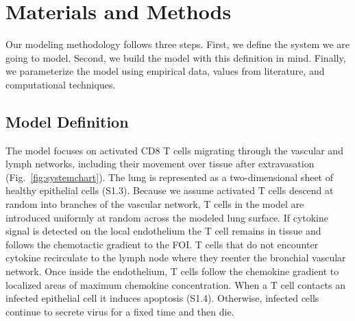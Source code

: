 \documentclass[10pt]{article}
\begin{document}
\section*{Materials and Methods}


Our modeling methodology follows three steps.  First, we define the system we are going to model.  Second, we build the model with this definition in mind.  Finally, we parameterize the model using empirical data, values from literature, and computational techniques.

\subsection*{Model Definition}


The model focuses on activated CD8 T cells migrating through the vascular and lymph networks, including their movement over tissue after extravasation (Fig.~\ref{fig:systemchart}).  The lung is represented as a two-dimensional sheet of healthy epithelial cells (S1.3).   Because we assume activated T cells descend at random into branches of the vascular network, T cells in the model are introduced uniformly at random across the modeled lung surface.  If cytokine signal is detected on the local endothelium the T cell remains in tissue and follows the chemotactic gradient to the FOI.  T cells that do not encounter cytokine recirculate to the lymph node where they reenter the bronchial vascular network.  Once inside the endothelium, T cells follow the chemokine gradient to localized areas of maximum chemokine concentration.  When a T cell contacts an infected epithelial cell it induces apoptosis (S1.4).  Otherwise, infected cells continue to secrete virus for a fixed time and then die.
\end{document}
